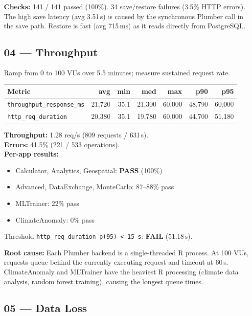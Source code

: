 \documentclass[11pt,a4paper]{article}
\newcommand{\pass}{\textcolor{pass}{\textbf{PASS}}}
\newcommand{\fail}{\textcolor{fail}{\textbf{FAIL}}}
\begin{document}
\medskip
\noindent\textbf{Checks:} 141 / 141 passed (100\%).
34 save/restore failures (3.5\% HTTP errors). The high save latency
(avg 3.51\,s) is caused by the synchronous Plumber call in the save
path. Restore is fast (avg 715\,ms) as it reads directly from PostgreSQL.

\subsection{04 — Throughput}

Ramp from 0 to 100 VUs over 5.5 minutes; measure sustained request rate.

\begin{tabular}{@{}lrrrrrr@{}}
\toprule
\textbf{Metric} & \textbf{avg} & \textbf{min} & \textbf{med} & \textbf{max} & \textbf{p90} & \textbf{p95} \\
\midrule
\texttt{throughput\_response\_ms} & 21,720 & 35.1 & 21,300 & 60,000 & 48,790 & 60,000 \\
\texttt{http\_req\_duration}      & 20,380 & 35.1 & 19,780 & 60,000 & 44,700 & 51,180 \\
\bottomrule
\end{tabular}

\medskip
\noindent
\textbf{Throughput:} 1.28 req/s (809 requests / 631\,s). \\
\textbf{Errors:} 41.5\% (221 / 533 operations). \\
\textbf{Per-app results:}
\begin{itemize}
  \item Calculator, Analytics, Geospatial: \pass{} (100\%)
  \item Advanced, DataExchange, MonteCarlo: 87--88\% pass
  \item MLTrainer: 22\% pass
  \item ClimateAnomaly: 0\% pass
\end{itemize}
Threshold \texttt{http\_req\_duration p(95) < 15\,s}: \fail{} (51.18\,s).

\noindent\textbf{Root cause:} Each Plumber backend is a single-threaded R
process. At 100 VUs, requests queue behind the currently executing request
and timeout at 60\,s. ClimateAnomaly and MLTrainer have the heaviest R
processing (climate data analysis, random forest training), causing the
longest queue times.

\subsection{05 — Data Loss}
\end{document}
